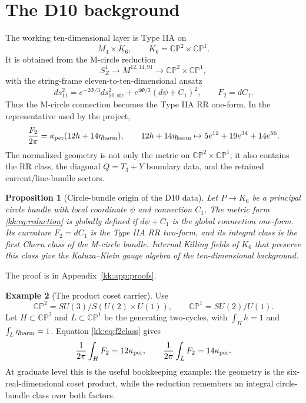 \documentclass[11pt]{article}
\newcommand{\CP}{\mathbb{CP}}
\theoremstyle{plain}
\newtheorem{proposition}{Proposition}[section]
\theoremstyle{definition}
\newtheorem{example}[proposition]{Example}
\begin{document}
\section{The D10 background}
\label{kk:sec:d10-background}

The working ten-dimensional layer is Type IIA on
\begin{equation}
  M_4\times K_6,\qquad K_6=\CP^2\times\CP^1 .
  \label{kk:eq:background}
\end{equation}
It is obtained from the M-circle reduction
\begin{equation}
  S^1_Z\longrightarrow M^{12,14,91}\longrightarrow \CP^2\times\CP^1 ,
  \label{kk:eq:m-circle}
\end{equation}
with the string-frame eleven-to-ten-dimensional ansatz
\begin{equation}
  ds_{11}^2=e^{-2\Phi/3}ds^2_{10,\mathrm{str}}
  +e^{4\Phi/3}(d\psi+C_1)^2,\qquad F_2=dC_1 .
  \label{kk:eq:reduction}
\end{equation}
Thus the M-circle connection becomes the Type IIA RR one-form.  In the
representative used by the project,
\begin{equation}
  \frac{F_2}{2\pi}=\kappa_{\rm per}(12h+14\eta_{\rm harm}),\qquad
  12h+14\eta_{\rm harm}\mapsto 5e^{12}+19e^{34}+14e^{56}.
  \label{kk:eq:f2class}
\end{equation}
The normalized geometry is not only the metric on \(\CP^2\times\CP^1\); it also
contains the RR class, the diagonal \(Q=T_3+Y\) boundary data, and the retained
current/line-bundle sectors.

\begin{proposition}[Circle-bundle origin of the D10 data]
\label{kk:prop:d10-data}
Let \(P\to K_6\) be a principal circle bundle with local coordinate \(\psi\)
and connection \(C_1\).  The metric form \eqref{kk:eq:reduction} is globally
defined if \(d\psi+C_1\) is the global connection one-form.  Its curvature
\(F_2=dC_1\) is the Type IIA RR two-form, and its integral class is the first
Chern class of the M-circle bundle.  Internal Killing fields of \(K_6\) that
preserve this class give the Kaluza--Klein gauge algebra of the ten-dimensional
background.
\end{proposition}
The proof is in Appendix~\ref{kk:app:proofs}.

\begin{example}[The product coset carrier]
\label{kk:ex:d10-cosets}
Use
\[
  \CP^2=SU(3)/S(U(2)\times U(1)),\qquad
  \CP^1=SU(2)/U(1).
\]
Let \(H\subset\CP^2\) and \(L\subset\CP^1\) be the generating two-cycles, with
\(\int_H h=1\) and \(\int_L\eta_{\rm harm}=1\).  Equation
\eqref{kk:eq:f2class} gives
\[
  \frac{1}{2\pi}\int_H F_2=12\kappa_{\rm per},\qquad
  \frac{1}{2\pi}\int_L F_2=14\kappa_{\rm per}.
\]
At graduate level this is the useful bookkeeping example: the geometry is the
six-real-dimensional coset product, while the reduction remembers an integral
circle-bundle class over both factors.
\end{example}
\end{document}
